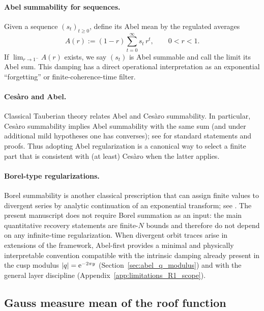 \paragraph{Abel summability for sequences.}
Given a sequence $(s_t)_{t\ge 0}$, define its Abel mean by the regulated averages
\begin{equation}
\label{eq:abel_mean_sequence}
A(r):=(1-r)\sum_{t=0}^{\infty} s_t\,r^t,\qquad 0<r<1.
\end{equation}
If $\lim_{r\to 1^-}A(r)$ exists, we say $(s_t)$ is Abel summable and call the limit its Abel sum.
This damping has a direct operational interpretation as an exponential ``forgetting'' or finite-coherence-time filter.
\par
\paragraph{Ces\`aro and Abel.}
Classical Tauberian theory relates Abel and Ces\`aro summability.
In particular, Ces\`aro summability implies Abel summability with the same sum (and under additional mild hypotheses one has converses); see \cite{Hardy1949} for standard statements and proofs.
Thus adopting Abel regularization is a canonical way to select a finite part that is consistent with (at least) Ces\`aro when the latter applies.
\par
\paragraph{Borel-type regularizations.}
Borel summability is another classical prescription that can assign finite values to divergent series by analytic continuation of an exponential transform; see \cite{Hardy1949}.
The present manuscript does not require Borel summation as an input: the main quantitative recovery statements are finite-$N$ bounds and therefore do not depend on any infinite-time regularization.
When divergent orbit traces arise in extensions of the framework, Abel-first provides a minimal and physically interpretable convention compatible with the intrinsic damping already present in the cusp modulus $|q|=\mathrm{e}^{-2\pi y}$ (Section~\ref{sec:abel_q_modulus}) and with the general layer discipline (Appendix~\ref{app:limitations_R1_scope}).

\subsection{Gauss measure mean of the roof function}
\label{app:gauss_roof_mean}

